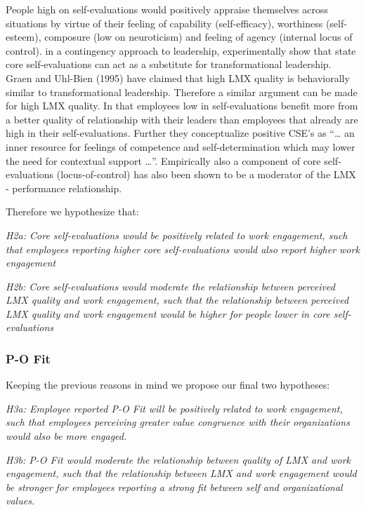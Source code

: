 People high on self-evaluations would positively appraise themselves
across situations by virtue of their feeling of capability
(self-efficacy), worthiness (self-esteem), composure (low on
neuroticism) and feeling of agency (internal locus of control). in a
contingency approach to leadership, experimentally show that state core
self-evaluations can act as a substitute for transformational
leadership. Graen and Uhl-Bien (1995) have claimed that high LMX quality
is behaviorally similar to transformational leadership. Therefore a
similar argument can be made for high LMX quality. In that employees low
in self-evaluations benefit more from a better quality of relationship
with their leaders than employees that already are high in their
self-evaluations. Further they conceptualize positive CSE's as
``\ldots{} an inner resource for feelings of competence and
self-determination which may lower the need for contextual support
\ldots{}''. Empirically also a component of core self-evaluations
(locus-of-control) has also been shown to be a moderator of the LMX -
performance relationship.

Therefore we hypothesize that:

\emph{H2a: Core self-evaluations would be positively related to work
engagement, such that employees reporting higher core self-evaluations
would also report higher work engagement}

\emph{H2b: Core self-evaluations would moderate the relationship between
perceived LMX quality and work engagement, such that the relationship
between perceived LMX quality and work engagement would be higher for
people lower in core self-evaluations}

\subsubsection{P-O Fit}\label{p-o-fit}

Keeping the previous reasons in mind we propose our final two
hypotheses:

\emph{H3a: Employee reported P-O Fit will be positively related to work
engagement, such that employees perceiving greater value congruence with
their organizations would also be more engaged.}

\emph{H3b: P-O Fit would moderate the relationship between quality of
LMX and work engagement, such that the relationship between LMX and work
engagement would be stronger for employees reporting a strong fit
between self and organizational values.}

